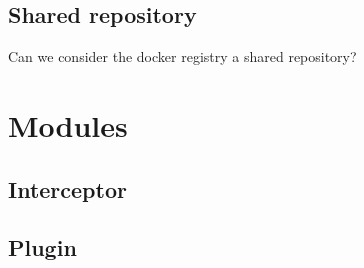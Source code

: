 \subsection{Shared repository}
Can we consider the docker registry a shared repository?




\section{Modules}
\subsection{Interceptor}
\subsection{Plugin}

